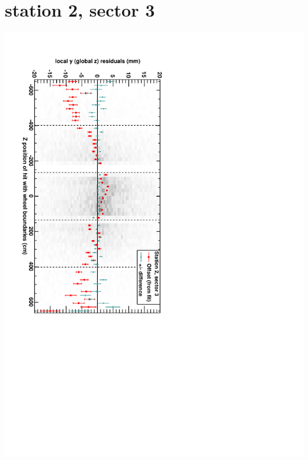 \documentclass[compress]{beamer}
\begin{document}
\section*{station 2, sector 3}
\begin{frame} \vfill \mbox{\hspace{-1 cm}\includegraphics[height=1.2\linewidth, angle=90]{DTzVsZ_st2_sr03.pdf}} \end{frame}
\end{document}
